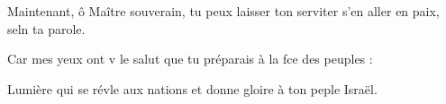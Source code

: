 \item Maintenant, ô Maître souverain,\pscross{} tu peux laisser ton serviter s’en aller\psstar{} en paix, seln ta parole.
\item Car mes yeux ont v le salut\psstar{} que tu préparais à la fce des peuples :
\item Lumière qui se révle aux nations\psstar{} et donne gloire à ton peple Israël.